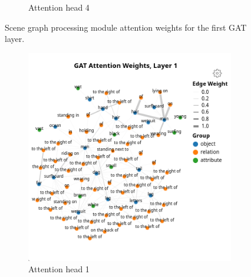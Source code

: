 \begin{figure}[htbp]
\begin{subfigure}[r]{0.49\textwidth}
        \caption{Attention head 4}
    \end{subfigure}
    \caption[GAT first layer attention weights.]{Scene graph processing module attention weights for the first GAT layer.}
    \label{fig:positive_logical_gat_l0}
\end{figure}

\begin{figure}[htbp]
    \centering
    \begin{subfigure}[l]{0.49\textwidth}
        \includegraphics[width=\textwidth]{figures/positive_logical/positive_logical_gat_l1_h0.png}
        \caption{Attention head 1}
    \end{subfigure}
    \begin{subfigure}[r]{0.49\textwidth}

\end{subfigure}
\end{figure}
